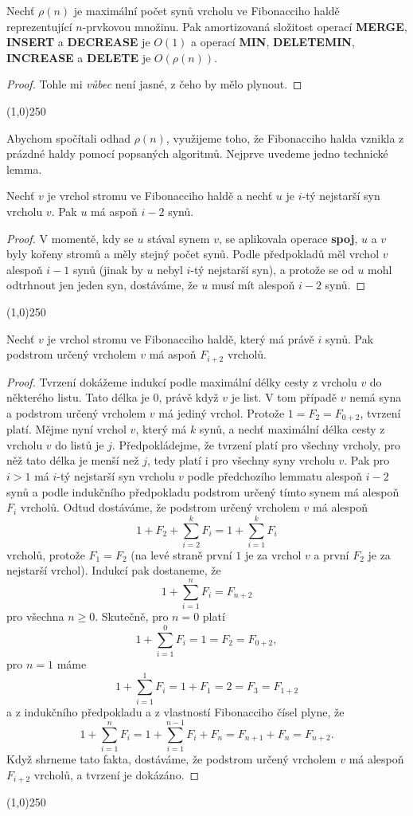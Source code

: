 \documentclass[a4paper,12pt]{article}
\newenvironment{myproof}{
  \begin{proof}
    
  }{
  \end{proof}
  \begin{center}
   \line(1,0){250}
   \end{center}
  }
\begin{document}
\begin{tvrzeni}
Nechť $\rho (n)$ je maximální 
počet synů vrcholu ve Fibonacciho haldě 
reprezentující $n$-prvkovou množinu.  Pak amortizovaná 
složitost operací {\bf MERGE}, {\bf INSERT} a {\bf DECREASE} je $
O(1)$ a 
operací {\bf MIN}, {\bf DELETEMIN}, {\bf INCREASE} a {\bf DELETE} je $
O(\rho (n))$.
\end{tvrzeni}
\begin{myproof}
    Tohle mi \emph{vůbec} není jasné, z čeho by mělo plynout.
\end{myproof}

Abychom spočítali odhad $\rho (n)$, využijeme toho, že 
Fibonacciho halda vznikla z prázdné haldy pomocí 
popsaných algoritmů. Nejprve uvedeme jedno technické 
lemma.

\begin{lemma}Nechť $v$ je vrchol stromu ve 
Fibonacciho haldě a nechť $u$ je $i$-tý nejstarší syn 
vrcholu $v$. Pak $u$ má aspoň $i-2$ synů.
\end{lemma}

\begin{myproof}V momentě, kdy se $u$ stával synem $v$, se 
aplikovala operace {\bf spoj}, $u$ a $v$ byly kořeny 
stromů a měly stejný počet synů. 
Podle předpokladů měl vrchol $v$ alespoň $i-1$ 
synů (jinak by $u$ nebyl $i$-tý nejstarší syn), a 
protože se od $u$ mohl odtrhnout jen jeden syn, 
dostáváme, že $u$ musí mít alespoň $i-2$ synů.
\end{myproof}

\begin{tvrzeni}Nechť $v$ je vrchol stromu ve 
Fibonacciho haldě, kte\-rý má právě $i$ synů. Pak 
podstrom určený vrcholem $v$ má aspoň $F_{i+2}$ 
vrcholů.
\end{tvrzeni}

\begin{myproof}Tvrzení dokážeme indukcí 
podle maximální délky cesty z vrcholu $v$ do některého 
listu.  Tato délka je $0$, právě když $v$ je list.  V tom 
případě $v$ nemá syna a podstrom určený vrcholem $
v$ má 
jediný vrchol.  Protože $1=F_2=F_{0+2}$, tvrzení platí.  
Mějme nyní vrchol $v$, který má $k$ 
synů, a nechť maximální délka cesty z vrcholu $
v$ do 
listů je $j$. Předpokládej\-me, že tvrzení platí pro 
všechny vrcholy, pro něž tato délka  
je menší než $j$,  tedy platí i pro 
všechny syny vrcholu $v$.  Pak pro $i>1$ má $i$-tý nejstarší 
syn vrcholu $v$ podle předchozího lemmatu alespoň $i-2$ 
synů a podle indukčního předpokladu podstrom určený 
tímto synem má alespoň $F_i$ vrcholů.  Odtud 
dostáváme, že podstrom určený vrcholem $v$ má alespoň 
$$1+F_2+\sum_{i=2}^kF_i=1+\sum_{i=1}^kF_i$$
vrcholů, protože $F_1=F_2$ (na levé straně první $
1$ 
je za vrchol $v$ a 
první $F_2$ je za nejstarší vrchol). Indukcí pak dostaneme, že 
$$1+\sum_{i=1}^nF_i=F_{n+2}$$
pro všechna $n\ge 0$. Skutečně, pro $n=0$ platí 
$$1+\sum_{i=1}^0F_i=1=F_2=F_{0+2},$$
pro $n=1$ máme 
$$1+\sum_{i=1}^1F_i=1+F_1=2=F_3=F_{1+2}$$
a z indukčního předpokladu a z vlastností Fibonacciho 
čísel plyne, že 
$$1+\sum_{i=1}^nF_i=1+\sum_{i=1}^{n-1}F_i+F_n=F_{n+1}+F_n=F_{n+2}
.$$
Když shrneme tato fakta, dostáváme, že podstrom 
určený vrcholem $v$ má alespoň $F_{i+2}$ vrcholů, a 
tvrzení je dokázáno.
\end{myproof}
\end{document}
